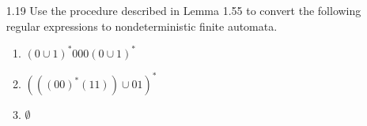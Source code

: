 \begin{enumerate}

    \item [1.19]
          Use the procedure described in Lemma 1.55 to convert the following regular expressions to nondeterministic finite automata.
          \begin{enumerate}
              \item $(0 \cup 1)^\ast000(0 \cup 1)^\ast$
              \item $(((00)^\ast(11)) \cup 01)^\ast$
              \item $\emptyset$
          \end{enumerate}

\end{enumerate}
